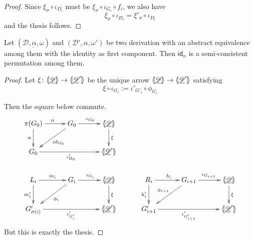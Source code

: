 \documentclass[a4paper,UKenglish,cleveref,pdftex,thm-restate,numberwithinsect]{lipics-v2021}
\newcommand{\id}[1]{\mathsf{id}_{#1}}
\def\G{\textbf {\textup{G}}}
\newcommand{\dder}[1]{\mathscr{#1}}
\newcommand{\der}[1]{\underline{\dder{#1}}}
\newcommand{\lpro}{\langle \hspace{-1.85pt}[}
\newcommand{\rpro}{]\hspace{-1.85pt}\rangle}
\newcommand{\tpro}[1]{\lpro \der{#1}\rpro}
\begin{document}
\begin{proof}
	Since $\xi_\sigma \circ \iota_{D_i}$ must be $\xi_\sigma \circ \iota_{G_i}\circ f_i$, we also have
	\[\xi_\sigma \circ \iota_{D_i}=\xi'_\sigma \circ \iota_{D_i}\] 
	and the thesis follows.
\end{proof}

\begin{proposition}\label{prop:abstoswitch}
	Let $(\der{D, \alpha, \omega})$ and $(\der{D}', \alpha, \omega')$ be two derivation with an abstract equivalence among them with the identity as first component. Then $\id{n}$ is a semi-consistent permutation among them.
\end{proposition}
\begin{proof}
Let $\xi\colon \tpro{D}\to \lpro \der{D}'\rpro$ be the unique arrow $\tpro{D}\to \lpro \der{D}'\rpro$ satisfying 
\[\xi \circ \iota_{G_i}:=\iota'_{G'_i}\circ \phi_{G_i}\] 

Then the square below commute.
	\[\xymatrix@C=30pt{\pi(G_0)\ar[r]^{\alpha} \ar[d]_{\alpha} & G_0 \ar[dl]^{\id{G_0}} \ar[r]^{\iota_{G_0}} &\tpro{D} \ar[d]^{\xi}\\ G_0 \ar[rr]_{\iota'_{G_0}} & &\lpro \der{D}' \rpro\\L_i \ar[r]^{m_i} \ar[d]_{m'_{i}}& G_i \ar[dl]^{\phi_i} \ar[r]^{\iota_{G_i}} &\tpro{D} \ar[d]^{\xi} & R_i \ar[r]^{h_i} \ar[d]_{h'_{i}}& G_{i+1} \ar[dl]_{\phi_{i+1}} \ar[r]^{\iota_{G_{i+1}}} &\tpro{D} \ar[d]^{\xi} \\G'_{\sigma(i)} \ar[rr]_{\iota'_{G'_{i}}}&& \lpro \der{D}' \rpro& G'_{i+1} \ar[rr]_{\iota'_{G'_{i+1}}}&& \lpro \der{D}' \rpro}\]
	But this is exactly the thesis.
\end{proof}
\end{document}
